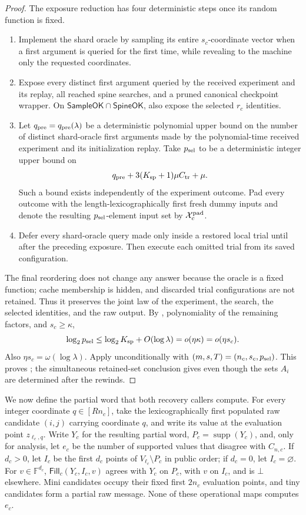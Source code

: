 \documentclass[11pt]{article}
\begin{document}
\begin{proof}
The exposure reduction has four deterministic steps once its random function
is fixed.
\begin{enumerate}[leftmargin=*,label=\arabic*.]
 \item Implement the shard oracle by sampling its entire $s_c$-coordinate
 vector when a first argument is queried for the first time, while revealing
 to the machine only the requested coordinates.
 \item Expose every distinct first argument queried by the received experiment
 and its replay, all reached spine searches, and a pruned canonical checkpoint
 wrapper.  On $\mathsf{SampleOK}\cap\mathsf{SpineOK}$, also expose the selected
 $r_c$ identities.
 \item Let $q_{\rm pre}=q_{\rm pre}(\lambda)$ be a deterministic polynomial
 upper bound on the number of distinct shard-oracle first arguments made by
 the polynomial-time received experiment and its initialization replay.  Take
 $p_{\rm sel}$ to be a deterministic integer upper bound on
\[
 q_{\rm pre}+3(K_{\rm sp}+1)\mu C_{\rm tr}+\mu.
\]
 Such a bound exists independently of the experiment outcome.  Pad every
 outcome with the length-lexicographically first fresh dummy inputs and denote
 the resulting $p_{\rm sel}$-element input set by
 $\mathcal X_c^{\rm pad}$.
 \item Defer every shard-oracle query made only inside a restored local trial
 until after the preceding exposure.  Then execute each omitted trial from its
 saved configuration.
\end{enumerate}
The final reordering does not change any answer because the oracle is a fixed
function; cache membership is hidden, and discarded trial configurations are
not retained.  Thus it preserves the joint law of the experiment,
the search, the selected identities, and the raw output.  By
, polynomiality of the remaining factors, and
$s_c\ge\kappa$,
\[
 \log_2p_{\rm sel}\le\log_2K_{\rm sp}+O(\log\lambda)
 =o(\eta\kappa)=o(\eta s_c).
\]
Also $\eta s_c=\omega(\log\lambda)$.  Apply  unconditionally
with $(m,s,T)=(n_c,s_c,p_{\rm sel})$.  This proves
; the simultaneous retained-set conclusion gives
 even though the sets $A_i$ are determined after
the rewinds.
\end{proof}

We now define the partial word that both recovery callers compute.  For every
integer coordinate $q\in[Rn_c]$, take the lexicographically first populated raw
candidate $(i,j)$ carrying coordinate $q$, and write its value at the evaluation
point $z_{\ell_c,q}$.  Write $Y_c$ for the resulting partial word,
$P_c=\operatorname{supp}(Y_c)$, and, only for analysis, let $e_c$ be the number
of supported values that disagree with $C_{n,c}$.  If $d_c>0$, let $I_c$ be
the first $d_c$ points of $V_{\ell_c}\setminus P_c$ in public order; if
$d_c=0$, let $I_c=\varnothing$.  For $v\in\mathbb F^{d_c}$,
$\mathsf{Fill}_c(Y_c,I_c,v)$ agrees with $Y_c$ on $P_c$, with $v$ on $I_c$,
and is $\bot$ elsewhere.  Mini candidates occupy their fixed first $2n_c$
evaluation points, and tiny candidates form a partial raw message.  None of
these operational maps computes $e_c$.
\end{document}
